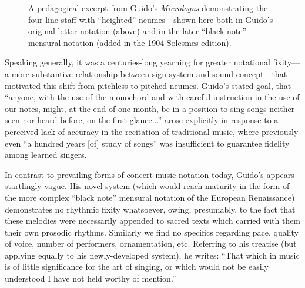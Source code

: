         \begin{figure}
            \centering
            \captionsetup{width=.5\linewidth}
            \caption[A pedagogical excerpt from Guido's \textit{Micrologus} demonstrating the four-line staff with ``heighted'' neumes---shown here both in Guido's original letter notation (above) and in the later ``black note'' mensural notation (added in the 1904 Solesmes edition).]{A pedagogical excerpt from Guido's \textit{Micrologus} demonstrating the four-line staff with ``heighted'' neumes---shown here both in Guido's original letter notation (above) and in the later ``black note'' mensural notation (added in the 1904 Solesmes edition).\footnotemark}
            \label{fig:guidonew}
        \end{figure}

    Speaking generally, it was a centuries-long yearning for greater notational fixity---a more substantive relationship between sign-system and sound concept---that motivated this shift from pitchless to pitched neumes. Guido's stated goal, that ``anyone, with the use of the monochord and with careful instruction in the use of our notes, might, at the end of one month, be in a position to sing songs neither seen nor heard before, on the first glance...''\autocite[16]{Arezzo_1943} arose explicitly in response to a perceived lack of accuracy in the recitation of traditional music, where previously even ``a hundred years [of] study of songs''\autocite[17]{Arezzo_1943} was insufficient to guarantee fidelity among learned singers.


    In contrast to prevailing forms of concert music notation today, Guido's appears startlingly vague. His novel system (which would reach maturity in the form of the more complex ``black note'' mensural notation of the European Renaissance) demonstrates no rhythmic fixity whatsoever, owing, presumably, to the fact that these melodies were necessarily appended to sacred texts which carried with them their own prosodic rhythms. Similarly we find no specifics regarding pace, quality of voice, number of performers, ornamentation, etc. Referring to his treatise (but applying equally to his newly-developed system), he writes: ``That which in music is of little significance for the art of singing, or which would not be easily understood I have not held worthy of mention.''

